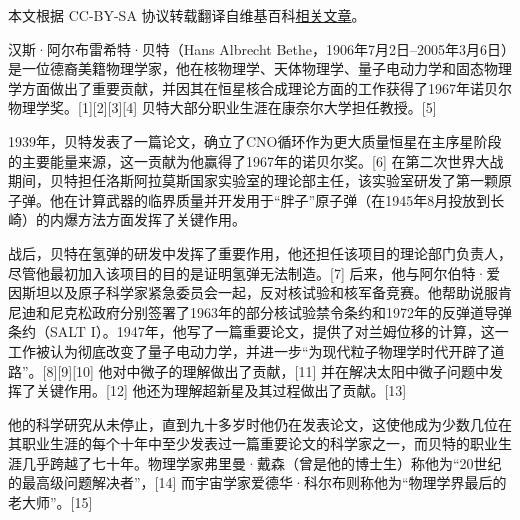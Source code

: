 
本文根据 CC-BY-SA 协议转载翻译自维基百科\href{https://en.wikipedia.org/wiki/Hans_Bethe#Honors_and_awards}{相关文章}。


汉斯·阿尔布雷希特·贝特（Hans Albrecht Bethe，1906年7月2日–2005年3月6日）是一位德裔美籍物理学家，他在核物理学、天体物理学、量子电动力学和固态物理学方面做出了重要贡献，并因其在恒星核合成理论方面的工作获得了1967年诺贝尔物理学奖。[1][2][3][4] 贝特大部分职业生涯在康奈尔大学担任教授。[5]

1939年，贝特发表了一篇论文，确立了CNO循环作为更大质量恒星在主序星阶段的主要能量来源，这一贡献为他赢得了1967年的诺贝尔奖。[6] 在第二次世界大战期间，贝特担任洛斯阿拉莫斯国家实验室的理论部主任，该实验室研发了第一颗原子弹。他在计算武器的临界质量并开发用于“胖子”原子弹（在1945年8月投放到长崎）的内爆方法方面发挥了关键作用。

战后，贝特在氢弹的研发中发挥了重要作用，他还担任该项目的理论部门负责人，尽管他最初加入该项目的目的是证明氢弹无法制造。[7] 后来，他与阿尔伯特·爱因斯坦以及原子科学家紧急委员会一起，反对核试验和核军备竞赛。他帮助说服肯尼迪和尼克松政府分别签署了1963年的部分核试验禁令条约和1972年的反弹道导弹条约（SALT I）。1947年，他写了一篇重要论文，提供了对兰姆位移的计算，这一工作被认为彻底改变了量子电动力学，并进一步“为现代粒子物理学时代开辟了道路”。[8][9][10] 他对中微子的理解做出了贡献，[11] 并在解决太阳中微子问题中发挥了关键作用。[12] 他还为理解超新星及其过程做出了贡献。[13]

他的科学研究从未停止，直到九十多岁时他仍在发表论文，这使他成为少数几位在其职业生涯的每个十年中至少发表过一篇重要论文的科学家之一，而贝特的职业生涯几乎跨越了七十年。物理学家弗里曼·戴森（曾是他的博士生）称他为“20世纪的最高级问题解决者”，[14] 而宇宙学家爱德华·科尔布则称他为“物理学界最后的老大师”。[15]